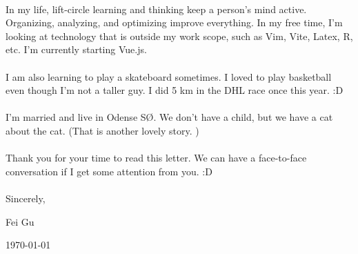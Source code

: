 \paragraph{}
In my life, lift-circle learning and thinking keep a person's mind active. Organizing, analyzing, and optimizing improve everything. In my free time, I'm looking at technology that is outside my work scope, such as Vim, Vite, Latex, R, etc. I'm currently starting Vue.js.

\paragraph{}
I am also learning to play a skateboard sometimes. I loved to play basketball even though I'm not a taller guy. I did 5 km in the DHL race once this year. :D

\paragraph{}
I'm married and live in Odense SØ. We don't have a child, but we have a cat about the cat. (That is another lovely story. )

\paragraph{}
Thank you for your time to read this letter. We can have a face-to-face conversation if I get some attention from you. :D

\paragraph{}
{\hfill Sincerely,} \par
{\hfill Fei Gu} \par
{\hfill \today} \par
